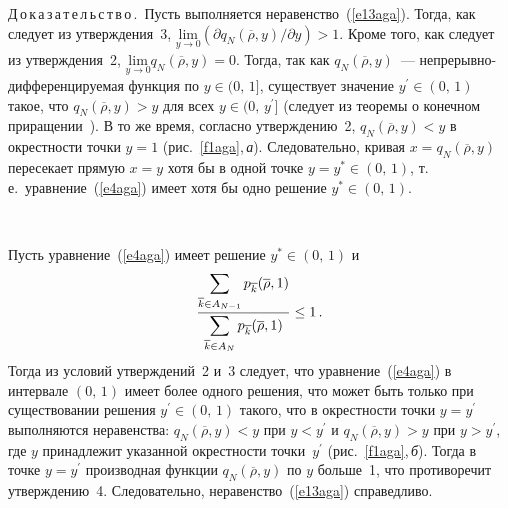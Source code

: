 \begin{multicols}{2}
\noindent
Д\,о\,к\,а\,з\,а\,т\,е\,л\,ь\,с\,т\,в\,о\,.\ Пусть выполняется 
неравенство~(\ref{e13aga}). Тогда, как следует из утверждения~3, 
$\underset{y\rightarrow 0}{\mathrm{lim}} (\partial q_N(\overline{\rho},y)/\partial y) 
>1$. Кроме того, как следует из утверждения~2, 
$\underset{y\rightarrow 0}{\mathrm{lim}} q_N(\overline{\rho},y)=0$. Тогда, так 
как $q_N(\overline{\rho},y)$~--- непрерывно-дифференцируемая функция по 
$y\in (0,\,1]$, существует значение $y^\prime \in (0,\,1)$ такое, что 
$q_N(\overline{\rho},y)>y$ для всех $y\in (0,\,y^\prime]$ (следует из теоремы о 
конечном приращении~\cite{11aga}). В то же время, согласно утверждению~2, 
$q_N(\overline{\rho},y)<y$ в окрестности точки $y=1$ (рис.~\ref{f1aga},\,\textit{а}). 
Следовательно, кривая $x=q_N(\overline{\rho},y)$ пересекает прямую $x=y$ 
хотя бы в одной точке $y=y^*\in (0,\,1)$, т.\,е.\ уравнение~(\ref{e4aga}) имеет 
хотя бы одно решение $y^*\in (0,\,1)$.

\begin{figure*}
\vspace*{1pt}
\begin{center}
\vspace*{1pt}
\mbox{%
\epsfxsize=158mm
}
\end{center}
\vspace*{-9pt}
\vspace*{6pt}
\end{figure*}

Пусть уравнение~(\ref{e4aga}) имеет решение $y^*\in (0,\,1)$ и 
\begin{equation}
\displaystyle\frac{\displaystyle \sum\limits_{\overline{k}\in A_{N-1}}p_{\overline{k}}(\overline{\rho},1)\mathstrut}{\displaystyle  
\sum\limits_{\overline{k}\in A_{N}}p_{\overline{k}}(\overline{\rho},1)\mathstrut}\leq 
1\,.\label{e14aga}
\end{equation}
Тогда из условий утверждений~2 и~3 следует, что 
уравнение~(\ref{e4aga}) в интервале $(0,\,1)$ имеет более одного решения, что 
может быть только при существовании решения $y^\prime \in (0,\,1)$ такого, 
что в окрестности точки $y=y^\prime$ выполняются неравенства: 
$q_N(\overline{\rho},y)<y$ при $y<y^\prime$ и $q_N(\overline{\rho},y)>y$ при 
$y>y^\prime$, где $y$ принадлежит указанной окрест\-ности точки~$y^\prime$ 
(рис.~\ref{f1aga},\,\textit{б}). Тогда в точке $y=y^\prime$ производная функции 
$q_N(\overline{\rho},y)$ по $y$ больше~1, что противоречит утверждению~4. 
Следовательно, неравенство~(\ref{e13aga}) справедливо.



\end{multicols}
